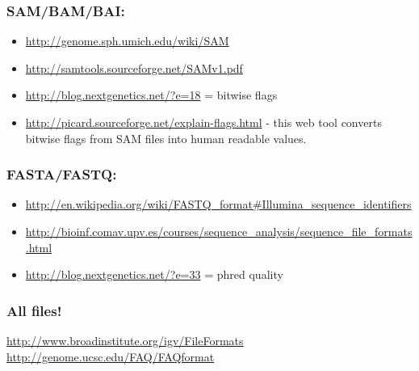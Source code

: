 \documentclass[a4paper,11pt,english]{sphinxmanual}
\begin{document}
\subsubsection{SAM/BAM/BAI:}
\label{exercises/known_file_formats:sam-bam-bai}\begin{itemize}
\item {} 
\href{http://genome.sph.umich.edu/wiki/SAM}{http://genome.sph.umich.edu/wiki/SAM}

\item {} 
\href{http://samtools.sourceforge.net/SAMv1.pdf}{http://samtools.sourceforge.net/SAMv1.pdf}

\item {} 
\href{http://blog.nextgenetics.net/?e=18}{http://blog.nextgenetics.net/?e=18} = bitwise flags

\item {} 
\href{http://picard.sourceforge.net/explain-flags.html}{http://picard.sourceforge.net/explain-flags.html} - this web tool converts bitwise flags from SAM files into human readable values.

\end{itemize}


\subsubsection{FASTA/FASTQ:}
\label{exercises/known_file_formats:fasta-fastq}\begin{itemize}
\item {} 
\href{http://en.wikipedia.org/wiki/FASTQ\_format\#Illumina\_sequence\_identifiers}{http://en.wikipedia.org/wiki/FASTQ\_format\#Illumina\_sequence\_identifiers}

\item {} 
\href{http://bioinf.comav.upv.es/courses/sequence\_analysis/sequence\_file\_formats.html}{http://bioinf.comav.upv.es/courses/sequence\_analysis/sequence\_file\_formats.html}

\item {} 
\href{http://blog.nextgenetics.net/?e=33}{http://blog.nextgenetics.net/?e=33}  = phred quality

\end{itemize}


\subsubsection{All files!}
\label{exercises/known_file_formats:all-files}
\href{http://www.broadinstitute.org/igv/FileFormats}{http://www.broadinstitute.org/igv/FileFormats}
\href{http://genome.ucsc.edu/FAQ/FAQformat}{http://genome.ucsc.edu/FAQ/FAQformat}
\end{document}
